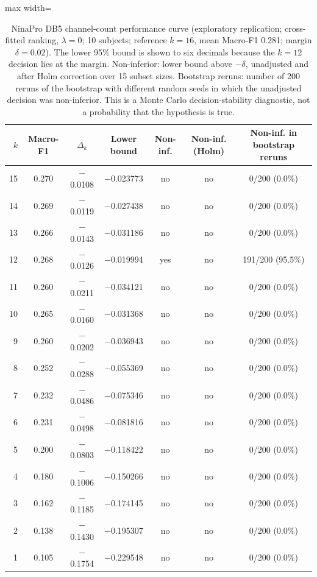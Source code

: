 \begin{table}[htbp]
\centering
\small
\caption{NinaPro DB5 channel-count performance curve (exploratory replication; cross-fitted ranking, $\lambda = 0$; 10 subjects; reference $k = 16$, mean Macro-F1 0.281; margin $\delta = 0.02$). The lower 95\% bound is shown to six decimals because the $k = 12$ decision lies at the margin. Non-inferior: lower bound above $-\delta$, unadjusted and after Holm correction over 15 subset sizes. Bootstrap reruns: number of 200 reruns of the bootstrap with different random seeds in which the unadjusted decision was non-inferior. This is a Monte Carlo decision-stability diagnostic, not a probability that the hypothesis is true.}
\label{tab:replication}
\setlength{\tabcolsep}{4pt}
\begin{adjustbox}{max width=\textwidth}
\begin{tabular}{rcccccc}
\toprule
$k$ & Macro-F1 & $\Delta_k$ & Lower bound & Non-inf. & Non-inf. (Holm) & Non-inf. in bootstrap reruns \\
\midrule
15 & 0.270 & $-$0.0108 & $-$0.023773 & no & no & 0/200 (0.0\%) \\
14 & 0.269 & $-$0.0119 & $-$0.027438 & no & no & 0/200 (0.0\%) \\
13 & 0.266 & $-$0.0143 & $-$0.031186 & no & no & 0/200 (0.0\%) \\
12 & 0.268 & $-$0.0126 & $-$0.019994 & yes & no & 191/200 (95.5\%) \\
11 & 0.260 & $-$0.0211 & $-$0.034121 & no & no & 0/200 (0.0\%) \\
10 & 0.265 & $-$0.0160 & $-$0.031368 & no & no & 0/200 (0.0\%) \\
9 & 0.260 & $-$0.0202 & $-$0.036943 & no & no & 0/200 (0.0\%) \\
8 & 0.252 & $-$0.0288 & $-$0.055369 & no & no & 0/200 (0.0\%) \\
7 & 0.232 & $-$0.0486 & $-$0.075346 & no & no & 0/200 (0.0\%) \\
6 & 0.231 & $-$0.0498 & $-$0.081816 & no & no & 0/200 (0.0\%) \\
5 & 0.200 & $-$0.0803 & $-$0.118422 & no & no & 0/200 (0.0\%) \\
4 & 0.180 & $-$0.1006 & $-$0.150266 & no & no & 0/200 (0.0\%) \\
3 & 0.162 & $-$0.1185 & $-$0.174145 & no & no & 0/200 (0.0\%) \\
2 & 0.138 & $-$0.1430 & $-$0.195307 & no & no & 0/200 (0.0\%) \\
1 & 0.105 & $-$0.1754 & $-$0.229548 & no & no & 0/200 (0.0\%) \\
\bottomrule
\end{tabular}
\end{adjustbox}
\end{table}
